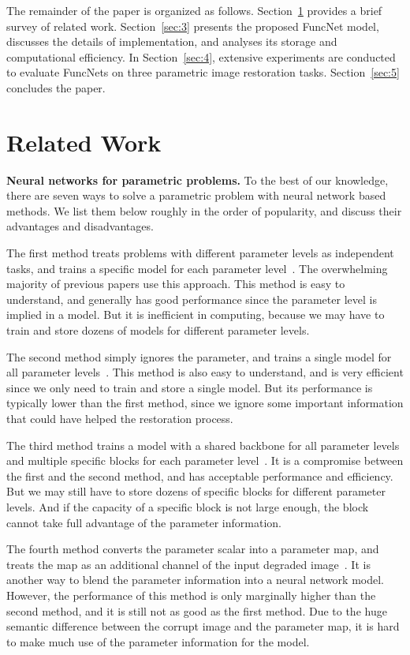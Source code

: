 \documentclass{article}
\begin{document}
The remainder of the paper is organized as follows. Section~\ref{sec:2} provides a brief survey of related work. Section~\ref{sec:3} presents the proposed FuncNet model, discusses the details of implementation, and analyses its storage and computational efficiency. In Section~\ref{sec:4}, extensive experiments are conducted to evaluate FuncNets on three parametric image restoration tasks. Section~\ref{sec:5} concludes the paper.

\section{Related Work}
\label{sec:2}

\textbf{Neural networks for parametric problems.} To the best of our knowledge, there are seven ways to solve a parametric problem with neural network based methods. We list them below roughly in the order of popularity, and discuss their advantages and disadvantages.

The first method treats problems with different parameter levels as independent tasks, and trains a specific model for each parameter level~\cite{dong2014learning,shi2016real,zhang2018image,zhang2017beyond,zhang2018dmcnn}. The overwhelming majority of previous papers use this approach. This method is easy to understand, and generally has good performance since the parameter level is implied in a model. But it is inefficient in computing, because we may have to train and store dozens of models for different parameter levels.

The second method simply ignores the parameter, and trains a single model for all parameter levels~\cite{kim2016accurate,yu2019deep}. This method is also easy to understand, and is very efficient since we only need to train and store a single model. But its performance is typically lower than the first method, since we ignore some important information that could have helped the restoration process.

The third method trains a model with a shared backbone for all parameter levels and multiple specific blocks for each parameter level~\cite{lim2017enhanced}. It is a compromise between the first and the second method, and has acceptable performance and efficiency. But we may still have to store dozens of specific blocks for different parameter levels. And if the capacity of a specific block is not large enough, the block cannot take full advantage of the parameter information.

The fourth method converts the parameter scalar into a parameter map, and treats the map as an additional channel of the input degraded image~\cite{zhang2018ffdnet}. It is another way to blend the parameter information into a neural network model. However, the performance of this method is only marginally higher than the second method, and it is still not as good as the first method. Due to the huge semantic difference between the corrupt image and the parameter map, it is hard to make much use of the parameter information for the model.
\end{document}
